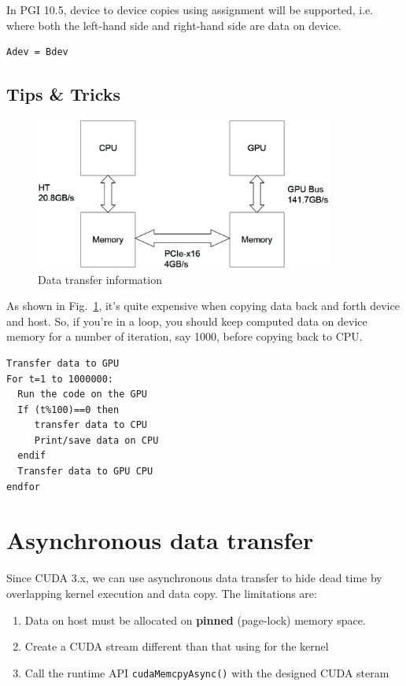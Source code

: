 In PGI 10.5, device to device copies using assignment will be supported, i.e.
where both the left-hand side
and right-hand side are data on device. 
\begin{lstlisting}
Adev = Bdev
\end{lstlisting}


\subsection{Tips \& Tricks}
\label{sec:tips--tricks}

\begin{figure}[hbt]
  \centerline{\includegraphics[height=5cm,
    angle=0]{./images/cuda_datamodel.eps}}
\caption{Data transfer information}
\label{fig:cuda_data}
\end{figure}

As shown in Fig.~\ref{fig:cuda_data}, it's quite expensive when
copying data back and forth device and host. So, if you're in a loop,
you should keep computed data on device memory for a number of
iteration, say 1000, before copying back to CPU.
\begin{verbatim}
Transfer data to GPU
For t=1 to 1000000:
  Run the code on the GPU
  If (t%100)==0 then
     transfer data to CPU
     Print/save data on CPU
  endif
  Transfer data to GPU CPU
endfor
\end{verbatim}

\section{Asynchronous data transfer}
\label{sec:cudaf_asynch_datacopy}

Since CUDA 3.x, we can use asynchronous data transfer to hide dead time by
overlapping kernel execution and data copy. The limitations are:
\begin{enumerate}
  \item Data on host must be allocated on {\bf pinned} (page-lock) memory space. 
  \item Create a CUDA stream different than that using for the kernel
  \item Call the runtime API \verb!cudaMemcpyAsync()! with the designed CUDA
  steram
\end{enumerate}


